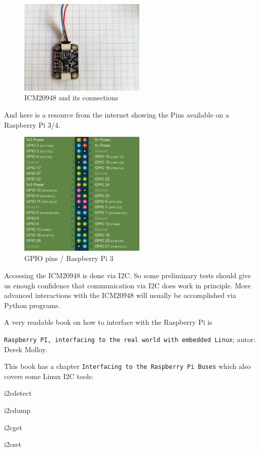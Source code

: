 \documentclass[paper=a4, oneside, fontsize=11pt,
parskip=full]{scrartcl}
\begin{document}
\begin{figure}[h]
	\centering
	\includegraphics[width=6cm]{images/ICM20948.jpg}
	\caption{ICM20948 and its connections}
\end{figure}	

And here is a resource from the internet showing the Pins available on a Raspberry Pi 3/4.

\begin{figure}[h]
	\centering
	\includegraphics[width=6cm]{images/gpio_pins_rpi3.png}
	\caption{GPIO pins / Raspberry Pi 3}
\end{figure}	
	

Accessing the ICM20948 is done via I2C. So some preliminary tests should give us enough confidence that communication via I2C does work in principle. More advanced interactions with the ICM20948 will usually be accomplished  via Python programs.


A very readable book on how to interface with the Raspberry Pi is

\texttt{Raspberry PI, interfacing to the real world with embedded Linux}; autor: Derek Molloy.

This book has a chapter \texttt{Interfacing to the Raspberry Pi Buses} which also covers some Linux I2C tools:

\begin{compactitem}
	\item i2cdetect
	\item i2cdump
	\item i2cget
	\item i2cset
\end{compactitem}
\end{document}
